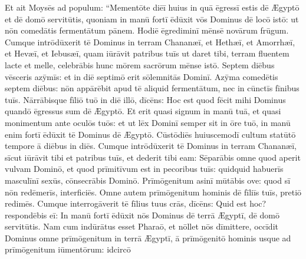 Et ait
Moysēs ad populum: ``Mementōte diēī huius in
quā ēgressī estis dē Ægyptō et dē domō servitūtis, quoniam in manū fortī
ēdūxit vōs Dominus dē locō istō: ut nōn comedātis fermentātum pānem. Hodiē ēgrediminī mēnsē
novārum frūgum. Cumque intrōdūxerit tē Dominus in terram
Chananæī, et Hethæī, et Amorrhæī, et Hevæī, et Iebusæī,
quam iūrāvit patribus tuīs ut daret tibi, terram fluentem
lacte et melle, celebrābis hunc mōrem sacrōrum mēnse istō.
Septem diēbus vēsceris azȳmīs: et in diē septimō erit
sōlemnitās Dominī. Azȳma comedētis septem diēbus: nōn appārēbit
apud tē aliquid fermentātum, nec in cūnctīs fīnibus tuīs. Nārrābisque
fīliō tuō in diē illō, dīcēns: Hoc est quod fēcit mihi Dominus quandō
ēgressus sum dē Ægyptō. Et erit quasi signum in manū tuā, et quasi
monimentum ante oculōs tuōs: et ut lēx Dominī semper sit
in ōre tuō, in manū enim fortī ēdūxit tē Dominus dē Ægyptō. Cūstōdiēs
huiuscemodī cultum statūtō tempore ā diēbus in diēs. Cumque intrōdūxerit
tē Dominus in terram Chananæī, sīcut iūrāvit tibi et patribus tuīs, et
dederit tibi eam: Sēparābis omne quod aperit vulvam
Dominō, et quod prīmitīvum est in pecoribus tuīs: quidquid
habuerīs masculīnī sexūs, 
cōnsecrābis Dominō. Prīmōgenitum asinī mūtābis ove: quod sī nōn redēmerīs,
interficiēs. Omne autem prīmōgenitum hominis dē fīliīs tuīs, pretiō
redimēs. Cumque interrogāverit tē fīlius tuus crās, dīcēns: Quid est
hoc? respondēbis eī: In manū fortī ēdūxit nōs Dominus dē terrā Ægyptī, dē
domō servitūtis. Nam cum indūrātus esset
Pharaō, et nōllet nōs dīmittere, occīdit Dominus omne
prīmōgenitum in terrā Ægyptī, ā prīmōgenitō hominis usque
ad prīmōgenitum iūmentōrum: idcircō
